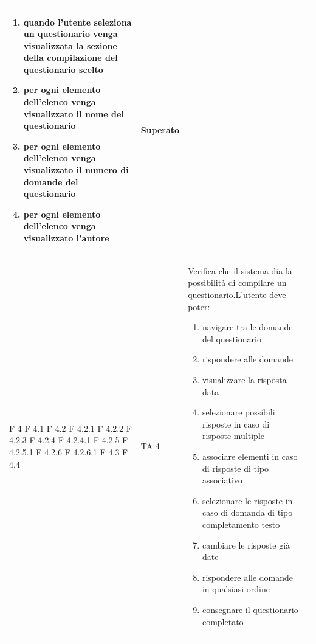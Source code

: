 \documentclass[a4paper,11pt]{article}
\begin{document}
\begin{longtable}{p{}p{}p{}p{}}
\begin{enumerate}
\item quando l'utente seleziona un questionario venga visualizzata la sezione della compilazione del questionario scelto
\item per ogni elemento dell'elenco venga visualizzato il nome del questionario
\item per ogni elemento dell'elenco venga visualizzato il numero di domande del questionario
\item per ogni elemento dell'elenco venga visualizzato l'autore
\end{enumerate} & Superato\\
\midrule
F 4 \newline F 4.1 \newline F 4.2 \newline F 4.2.1 \newline F 4.2.2 \newline F 4.2.3 \newline F 4.2.4 \newline F 4.2.4.1 \newline F 4.2.5 \newline F 4.2.5.1 \newline F 4.2.6 \newline F 4.2.6.1 \newline F 4.3 \newline F 4.4& TA 4& Verifica che il sistema dia la possibilità di compilare un questionario.\newline L'utente deve poter:
\begin{enumerate}
\item navigare tra le domande del questionario
\item rispondere alle domande
\item visualizzare la risposta data
\item selezionare possibili risposte in caso di risposte multiple
\item associare elementi in caso di risposte di tipo associativo
\item selezionare le risposte in caso di domanda di tipo completamento testo
\item cambiare le risposte già date
\item rispondere alle domande in qualsiasi ordine
\item consegnare il questionario completato


\end{enumerate}
\end{longtable}
\end{document}
